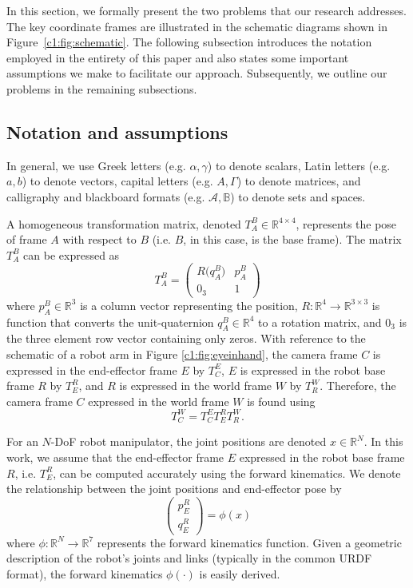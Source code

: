 In this section, we formally present the two problems that our research addresses. 
The key coordinate frames are illustrated in the schematic diagrams shown in Figure~\ref{c1:fig:schematic}. 
The following subsection introduces the notation employed in the entirety of this paper and also states some important assumptions we make to facilitate our approach. 
Subsequently, we outline our problems in the remaining subsections.

\subsection{Notation and assumptions}

In general, we use 
Greek letters (e.g. $\alpha, \gamma$) to denote scalars, 
Latin letters (e.g. $a, b$) to denote vectors, 
capital letters (e.g. $A, \Gamma$) to denote matrices, and 
calligraphy and blackboard formats (e.g. $\mathcal{A}, \mathbb{B}$) to denote sets and spaces.

A homogeneous transformation matrix, denoted $T^B_A\in\mathbb{R}^{4 \times 4}$, represents the pose of frame $A$ with respect to $B$ (i.e. $B$, in this case, is the base frame).
The matrix $T^B_A$ can be expressed as
\[
T^B_A = 
    \left(
    \begin{array}{cc}
     R\big(q^B_A\big) & p^B_A \\
     0_3 & 1
    \end{array}
    \right)
\]
where $p^B_A\in\mathbb{R}^3$ is a column vector representing the position, $R:\mathbb{R}^4\rightarrow\mathbb{R}^{3\times 3}$ is function that converts the unit-quaternion $q^B_A\in\mathbb{R}^4$ to a rotation matrix, and $0_3$ is the three element row vector containing only zeros.
With reference to the schematic of a robot arm in Figure \ref{c1:fig:eyeinhand}, the camera frame $C$ is expressed in the end-effector frame $E$ by $T^E_C$,
$E$ is expressed in the robot base frame $R$ by $T^R_E$, and
$R$ is expressed in the world frame $W$ by $T^W_R$.
Therefore, the camera frame $C$ expressed in the world frame $W$ is found using
\[
T^W_C = T^E_C T^R_E T^W_R.
\]

For an $N$-DoF robot manipulator, the joint positions are denoted $x\in\mathbb{R}^N$.
In this work, we assume that the end-effector frame $E$ expressed in the robot base frame $R$, i.e. $T^R_E$, can be computed accurately using the forward kinematics. 
We denote the relationship between the joint positions and end-effector pose by
\[
\left(
\begin{array}{c}
     p^R_E\\
     q^R_E
\end{array}
\right)
= \phi(x)
\]
where $\phi: \mathbb{R}^N\rightarrow\mathbb{R}^{7}$ represents the forward kinematics function.
Given a geometric description of the robot's joints and links (typically in the common URDF format), the forward kinematics $\phi(\cdot)$ is easily derived.

